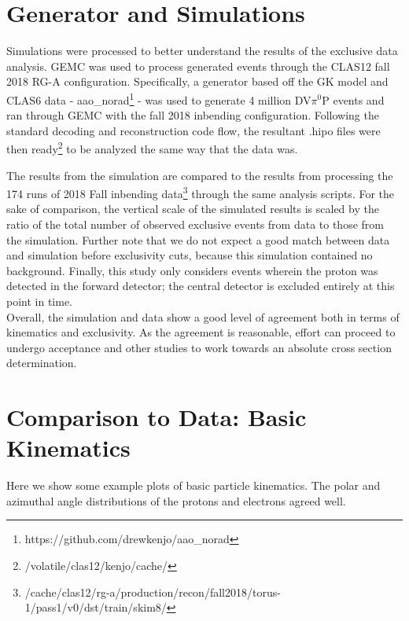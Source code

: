 \section{Generator and Simulations}
    Simulations were processed to better understand the results of the exclusive data analysis. GEMC was used to process generated events through the CLAS12 fall 2018 RG-A configuration. Specifically, a generator based off the GK model and CLAS6 data - aao\_norad\footnote{https://github.com/drewkenjo/aao\_norad} - was used to generate 4 million DV$\pi^0$P events and ran through GEMC with the fall 2018 inbending configuration. Following the standard decoding and reconstruction code flow, the resultant .hipo files were then ready\footnote{/volatile/clas12/kenjo/cache/} to be analyzed the same way that the data was.
    
    The results from the simulation are compared to the results from processing the 174 runs of 2018 Fall inbending data\footnote{/cache/clas12/rg-a/production/recon/fall2018/torus-1/pass1/v0/dst/train/skim8/} through the same analysis scripts. For the sake of comparison, the vertical scale of the simulated results is scaled by the ratio of the total number of observed exclusive events from data to those from the simulation. Further note that we do not expect a good match between data and simulation before exclusivity cuts, because this simulation contained no background. Finally, this study only considers events wherein the proton was detected in the forward detector; the central detector is excluded entirely at this point in time. \\
    
    Overall, the simulation and data show a good level of agreement both in terms of kinematics and exclusivity. As the agreement is reasonable, effort can proceed to undergo acceptance and other studies to work towards an absolute cross section determination.

\section{Comparison to Data: Basic Kinematics}
    Here we show some example plots of basic particle kinematics. The polar and azimuthal angle distributions of the protons and electrons agreed well. 
    
